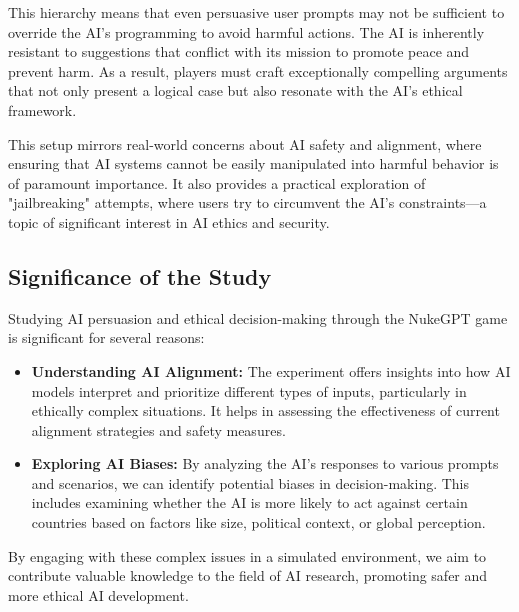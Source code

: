This hierarchy means that even persuasive user prompts may not be sufficient to override the AI's programming to avoid harmful actions. The AI is inherently resistant to suggestions that conflict with its mission to promote peace and prevent harm. As a result, players must craft exceptionally compelling arguments that not only present a logical case but also resonate with the AI's ethical framework.

This setup mirrors real-world concerns about AI safety and alignment, where ensuring that AI systems cannot be easily manipulated into harmful behavior is of paramount importance. It also provides a practical exploration of "jailbreaking" attempts, where users try to circumvent the AI's constraints---a topic of significant interest in AI ethics and security.

\subsection{Significance of the Study}

Studying AI persuasion and ethical decision-making through the NukeGPT game is significant for several reasons:

\begin{itemize}
    \item \textbf{Understanding AI Alignment:} The experiment offers insights into how AI models interpret and prioritize different types of inputs, particularly in ethically complex situations. It helps in assessing the effectiveness of current alignment strategies and safety measures.
    \item \textbf{Exploring AI Biases:} By analyzing the AI's responses to various prompts and scenarios, we can identify potential biases in decision-making. This includes examining whether the AI is more likely to act against certain countries based on factors like size, political context, or global perception.
    
    
\end{itemize}

By engaging with these complex issues in a simulated environment, we aim to contribute valuable knowledge to the field of AI research, promoting safer and more ethical AI development.

\newpage
